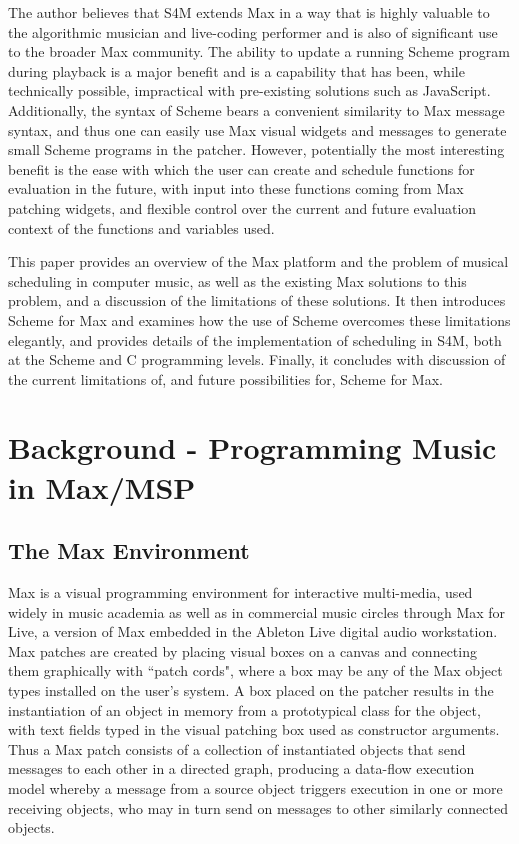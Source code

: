 \documentclass[acmsmall]{acmart}
\begin{document}
The author believes that S4M extends Max in a way that is highly valuable to 
the algorithmic musician and live-coding performer and is also of significant 
use to the broader Max community. The ability to update
a running Scheme program during playback is a major benefit
and is a capability that has been, while technically possible, impractical
with pre-existing solutions such as JavaScript. Additionally, the syntax
of Scheme bears a convenient similarity to Max message syntax, and thus 
one can easily use Max visual widgets and messages to generate small Scheme programs in the
patcher. However, potentially the most interesting benefit is the ease with which the user 
can create and schedule functions for evaluation in the future, with 
input into these functions coming from Max patching widgets, and flexible control
over the current and future evaluation context of the functions and variables used.

This paper provides an overview of the Max platform and the problem of musical scheduling
in computer music, as well as the existing Max solutions to this problem, 
and a discussion of the limitations of these solutions.
It then introduces Scheme for Max and examines how the use of Scheme
overcomes these limitations elegantly, and provides details of
the implementation of scheduling in S4M, both at the Scheme and
C programming levels. Finally, it concludes with discussion of 
the current limitations of, and future possibilities for, Scheme for Max. 

\section{Background - Programming Music in Max/MSP}

\subsection{The Max Environment}

Max is a visual programming environment for interactive multi-media, 
used widely in music academia as well as in commercial music circles through Max for Live, 
a version of Max embedded in the Ableton Live digital audio workstation. 
Max patches are created by placing visual boxes on a canvas 
and connecting them graphically with ``patch cords", where a box may be
any of the Max object types installed on the user's system. A box placed on the patcher
results in the instantiation of an object in memory from a prototypical class for the object, with
text fields typed in the visual patching box used as constructor arguments. 
Thus a Max patch consists of a collection of instantiated objects that send messages to each other
in a directed graph, producing a data-flow execution model whereby a message from a source 
object triggers execution in one or more 
receiving objects, who may in turn send on messages to other similarly connected objects. 
\end{document}
